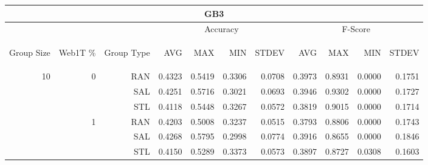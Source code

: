 \begin{center}
\begin{table}[htbp]
\begin{tabular}{ | r | r | r | r | r | r | r | r | r | r | r |}
\hline
\multicolumn{11}{|c|}{GB3}\\
\hline
 & & & \multicolumn{4}{|c|}{Accuracy} & \multicolumn{4}{|c|}{F-Score}\\ \cline{4-11}
\begin{sideways}Group Size\end{sideways} & \begin{sideways}Web1T \%\end{sideways} & \begin{sideways}Group Type\end{sideways} & \begin{sideways}AVG\end{sideways} & \begin{sideways}MAX\end{sideways} & \begin{sideways}MIN\end{sideways} & \begin{sideways}STDEV\end{sideways} & \begin{sideways}AVG\end{sideways} & \begin{sideways}MAX\end{sideways} & \begin{sideways}MIN\end{sideways} & \begin{sideways}STDEV\end{sideways}\\
\hline
\multirow{18}{*}{10}
 & \multirow{3}{*}{0} & RAN & 0.4323 & 0.5419 & 0.3306 & 0.0708 & 0.3973 & 0.8931 & 0.0000 & 0.1751\\ \cline{3-11}
 &   & SAL & 0.4251 & 0.5716 & 0.3021 & 0.0693 & 0.3946 & 0.9302 & 0.0000 & 0.1727\\ \cline{3-11}
 &   & STL & 0.4118 & 0.5448 & 0.3267 & 0.0572 & 0.3819 & 0.9015 & 0.0000 & 0.1714\\ \cline{2-11}
 & \multirow{3}{*}{1} & RAN & 0.4203 & 0.5008 & 0.3237 & 0.0515 & 0.3793 & 0.8806 & 0.0000 & 0.1743\\ \cline{3-11}
 &   & SAL & 0.4268 & 0.5795 & 0.2998 & 0.0774 & 0.3916 & 0.8655 & 0.0000 & 0.1846\\ \cline{3-11}
 &   & STL & 0.4150 & 0.5289 & 0.3373 & 0.0573 & 0.3897 & 0.8727 & 0.0308 & 0.1603\\ \cline{2-11}

\end{tabular}
\end{table}
\end{center}
